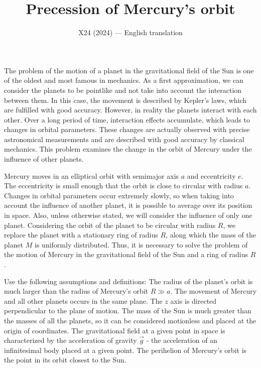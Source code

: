 \documentclass[11pt,a4paper]{article}
\title{\textbf{Precession of Mercury's orbit}}
\author{\normalsize X24 (2024) --- English translation}
\date{}
\begin{document}
\maketitle

The problem of the motion of a planet in the gravitational field of the Sun is one of the oldest and most famous in mechanics. As a first approximation, we can consider the planets to be pointlike and not take into account the interaction between them. In this case, the movement is described by Kepler's laws, which are fulfilled with good accuracy. However, in reality the planets interact with each other. Over a long period of time, interaction effects accumulate, which leads to changes in orbital parameters. These changes are actually observed with precise astronomical measurements and are described with good accuracy by classical mechanics. This problem examines the change in the orbit of Mercury under the influence of other planets.

Mercury moves in an elliptical orbit with semimajor axis $a$ and eccentricity $e$. The eccentricity is small enough that the orbit is close to circular with radius $a$. Changes in orbital parameters occur extremely slowly, so when taking into account the influence of another planet, it is possible to average over its position in space. Also, unless otherwise stated, we will consider the influence of only one planet. Considering the orbit of the planet to be circular with radius $R$, we replace the planet with a stationary ring of radius $R$, along which the mass of the planet $M$ is uniformly distributed.  Thus, it is necessary to solve the problem of the motion of Mercury in the gravitational field of the Sun and a ring of radius $R$.

Use the following assumptions and definitions: The radius of the planet's orbit is much larger than the radius of Mercury's orbit $R \gg a$. The movement of Mercury and all other planets occurs in the same plane. The $z$ axis is directed perpendicular to the plane of motion. The mass of the Sun is much greater than the masses of all the planets, so it can be considered motionless and placed at the origin of coordinates. The gravitational field at a given point in space is characterized by the acceleration of gravity $\vec{g}$ - the acceleration of an infinitesimal body placed at a given point. The perihelion of Mercury's orbit is the point in its orbit closest to the Sun.
\end{document}
